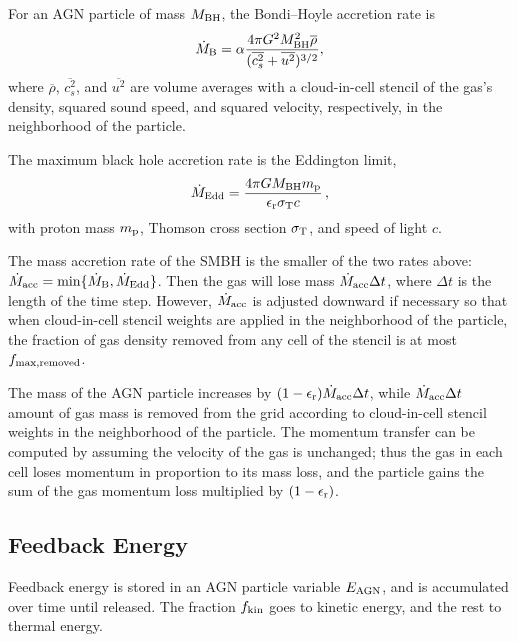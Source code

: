 For an AGN particle of mass $M_{\rm BH}$,
the Bondi--Hoyle accretion rate is
\begin{equation}
\dot{M}_{\rm B} = \alpha
\frac{4 \pi G^2 M_{\rm BH}^2 \overline{\rho}}{(\overline{c_s^2} + \overline{u^2})^{3/2}} ,
\end{equation}
where 
$\overline{\rho}$, $\overline{c_s^2}$, and $\overline{u^2}$ are volume
averages with a cloud-in-cell stencil of the gas's density, 
squared sound speed, and squared velocity, respectively,
in the neighborhood of the particle.

The maximum black hole accretion rate is the Eddington limit,
\begin{equation}
\dot{M}_{\rm Edd} = 
\frac{4 \pi G M_{\rm BH} m_{\rm p}}{\epsilon_{\rm r} \sigma_{\rm T} c} \, ,
\end{equation}
with proton mass $m_{\rm p}$,
Thomson cross section $\sigma_{\rm T}$,
and speed of light $c$.

The mass accretion rate of the SMBH is the smaller of the two rates above:
$\dot{M}_{\rm acc} = {\rm min} \{ \dot{M}_{\rm B}, \dot{M}_{\rm Edd} \}$.
Then the gas will lose mass $\dot{M}_{\rm acc} \Delta t$, where
$\Delta t$ is the length of the time step.
However, $\dot{M}_{\rm acc}$ is adjusted downward if necessary so that
when cloud-in-cell stencil weights are applied in the neighborhood of
the particle, the fraction of gas density removed from any cell of the
stencil is at most $f_{\rm max, removed}$.

The mass of the AGN particle increases by 
$(1-\epsilon_{\rm r}) \dot{M}_{\rm acc} \Delta t$,
while $\dot{M}_{\rm acc} \Delta t$ amount of gas mass is removed from
the grid according to cloud-in-cell stencil weights in the
neighborhood of the particle.
The momentum transfer can be computed by assuming the velocity of the
gas is unchanged;  thus the gas in each cell loses momentum in
proportion to its mass loss, and the particle gains the sum of the gas
momentum loss multiplied by $(1-\epsilon_{\rm r})$. 

\subsection{Feedback Energy}

Feedback energy is stored in an AGN particle variable $E_{\rm AGN}$,
and is accumulated over time until released.
The fraction $f_{\rm kin}$ goes to kinetic energy, and the rest to
thermal energy.

